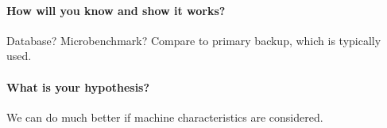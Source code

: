 \documentclass{article}
\begin{document}
\paragraph{How will you know and show it works?} Database?
Microbenchmark? Compare to primary backup, which is typically used.

\paragraph{What is your hypothesis?} We can do much better if machine
characteristics are considered.


\newpage



\label{LastPage}
\end{document}
